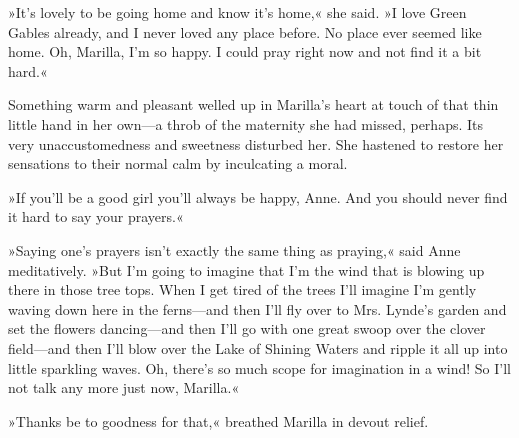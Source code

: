 »It's lovely to be going home and know it's home,« she said. »I love Green Gables already, and I never loved any place before. No place ever seemed like home. Oh, Marilla, I'm so happy. I could pray right now and not find it a bit hard.«

Something warm and pleasant welled up in Marilla's heart at touch of that thin little hand in her own—a throb of the maternity she had missed, perhaps. Its very unaccustomedness and sweetness disturbed her. She hastened to restore her sensations to their normal calm by inculcating a moral.

»If you'll be a good girl you'll always be happy, Anne. And you should never find it hard to say your prayers.«

»Saying one's prayers isn't exactly the same thing as praying,« said Anne meditatively. »But I'm going to imagine that I'm the wind that is blowing up there in those tree tops. When I get tired of the trees I'll imagine I'm gently waving down here in the ferns—and then I'll fly over to Mrs. Lynde's garden and set the flowers dancing—and then I'll go with one great swoop over the clover field—and then I'll blow over the Lake of Shining Waters and ripple it all up into little sparkling waves. Oh, there's so much scope for imagination in a wind! So I'll not talk any more just now, Marilla.«

»Thanks be to goodness for that,« breathed Marilla in devout relief.

